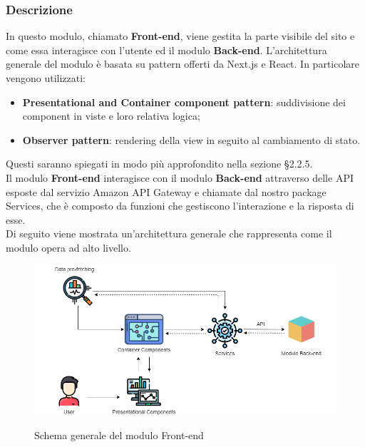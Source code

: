 \subsubsection{Descrizione}

In questo modulo, chiamato \textbf{Front-end}, viene gestita la parte visibile del sito \nameproject{} e come essa interagisce con l'utente ed il modulo \textbf{Back-end}. L'architettura generale del modulo è basata su pattern offerti da Next.js e React. In particolare vengono utilizzati:
\begin{itemize}
	\item \textbf{Presentational and Container component pattern}: suddivisione dei component in viste e loro relativa logica;
	\item \textbf{Observer pattern}: rendering della view in seguito al cambiamento di stato.
\end{itemize} 
Questi saranno spiegati in modo più approfondito nella sezione \S{2.2.5}.\\
Il modulo \textbf{Front-end} interagisce con il modulo \textbf{Back-end} attraverso delle API esposte dal servizio Amazon API Gateway e chiamate dal nostro package Services, che è composto da funzioni che gestiscono l'interazione e la risposta di esse. \\
Di seguito viene mostrata un'architettura generale che rappresenta come il modulo opera ad alto livello.

\vspace{1cm}

\begin{figure}[H]
\centering
\includegraphics[scale=0.48]{res/Architettura/Frontend/img/general_frontend}\\
\caption{Schema generale del modulo Front-end}
\end{figure}